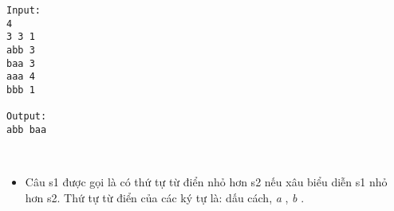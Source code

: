 \begin{verbatim}
Input:
4
3 3 1
abb 3
baa 3
aaa 4
bbb 1

Output:
abb baa
\end{verbatim}
 
\begin{itemize}
	\item Câu s1 được gọi là có thứ tự từ điển nhỏ hơn s2 nếu xâu biểu diễn s1 nhỏ hơn s2. Thứ tự từ điển của các ký tự là: dấu cách, \emph{ a } , \emph{ b } .
\end{itemize}